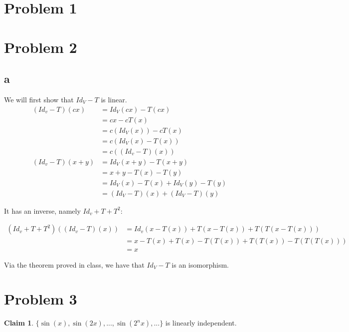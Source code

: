 \documentclass[12pt,letterpaper]{article}
\theoremstyle{definition}
\newtheorem*{claim}{Claim}
\begin{document}
\section*{Problem 1}



\section*{Problem 2}

\subsection*{a}

We will first show that $Id_V - T$ is linear.
\begin{align*}
  (Id_v-T)(cx) &= Id_V(cx) - T(cx) \\
               &= cx - cT(x) \\
               &= c(Id_V(x)) - cT(x) \\
               &= c(Id_V(x) - T(x)) \\
               &= c((Id_v - T)(x)) \\
  (Id_v - T)(x + y) &= Id_V(x + y) - T(x + y) \\
               &= x + y - T(x) - T(y) \\
               &= Id_V(x) - T(x) + Id_V(y) - T(y) \\
               &= (Id_V - T)(x) + (Id_V - T)(y)
\end{align*}

It has an inverse, namely $Id_v + T + T^2$:

\begin{align*}
  (Id_v + T + T^2)((Id_v - T)(x)) &= Id_v(x - T(x)) + T(x - T(x)) + T(T(x - T(x))) \\
                                  &= x - T(x) + T(x) - T(T(x)) + T(T(x)) - T(T(T(x))) \\
                                  &= x
\end{align*}

Via the theorem proved in class, we have that $Id_V - T$ is an isomorphism.

\section*{Problem 3}

\begin{claim}
  $\{\sin(x), \sin(2x),..., \sin(2^nx),...\}$ is linearly independent.
\end{claim}
\end{document}
